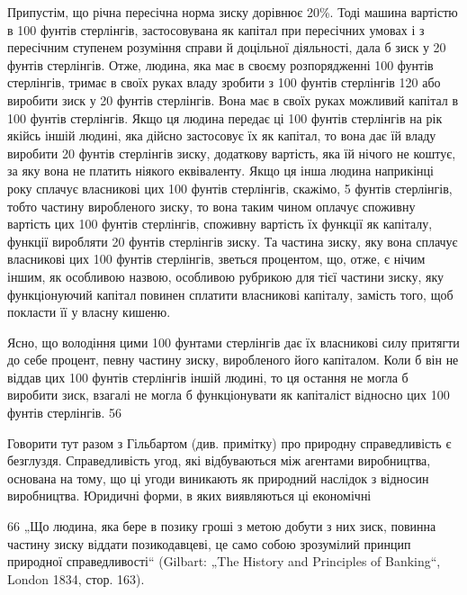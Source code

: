 Припустім, що річна пересічна норма зиску дорівнює 20\%.
Тоді машина вартістю в 100 фунтів стерлінгів, застосовувана
як капітал при пересічних умовах і з пересічним ступенем розуміння
справи й доцільної діяльності, дала б зиск у 20 фунтів
стерлінгів. Отже, людина, яка має в своєму розпорядженні
100 фунтів стерлінгів, тримає в своїх руках владу зробити
з 100 фунтів стерлінгів 120 або виробити зиск у 20 фунтів стерлінгів.
Вона має в своїх руках можливий капітал в 100 фунтів
стерлінгів. Якщо ця людина передає ці 100 фунтів стерлінгів
на рік якійсь іншій людині, яка дійсно застосовує їх як капітал,
то вона дає їй владу виробити 20 фунтів стерлінгів зиску, додаткову
вартість, яка їй нічого не коштує, за яку вона не платить
ніякого еквіваленту. Якщо ця інша людина наприкінці
року сплачує власникові цих 100 фунтів стерлінгів, скажімо,
5 фунтів стерлінгів, тобто частину виробленого зиску, то вона
таким чином оплачує споживну вартість цих 100 фунтів стерлінгів,
споживну вартість їх функції як капіталу, функції виробляти
20 фунтів стерлінгів зиску. Та частина зиску, яку вона
сплачує власникові цих 100 фунтів стерлінгів, зветься процентом,
що, отже, є нічим іншим, як особливою назвою, особливою
рубрикою для тієї частини зиску, яку функціонуючий капітал
повинен сплатити власникові капіталу, замість того, щоб покласти
її у власну кишеню.

Ясно, що володіння цими 100 фунтами стерлінгів дає їх
власникові силу притягти до себе процент, певну частину
зиску, виробленого його капіталом. Коли б він не віддав цих
100 фунтів стерлінгів іншій людині, то ця остання не могла б
виробити зиск, взагалі не могла б функціонувати як капіталіст
відносно цих 100 фунтів стерлінгів. 56

Говорити тут разом з Гільбартом (див. примітку) про природну
справедливість є безглуздя. Справедливість угод, які
відбуваються між агентами виробництва, основана на тому, що
ці угоди виникають як природний наслідок з відносин виробництва.
Юридичні форми, в яких виявляються ці економічні

66 „Що людина, яка бере в позику гроші з метою добути з них зиск, повинна
частину зиску віддати позикодавцеві, це само собою зрозумілий принцип
природної справедливості“ (Gilbart: „The History and Principles of Banking“,
London 1834, стор. 163).
\parbreak{}  %
